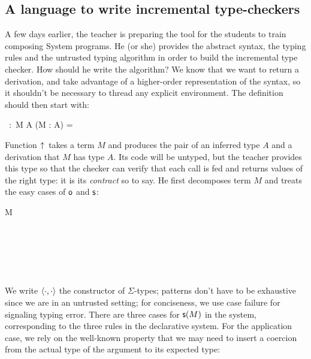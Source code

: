 \documentclass[9pt]{sigplanconf}
\begin{document}
\subsection{A language to write incremental type-checkers}

A few days earlier, the teacher is preparing the tool for the students
to train composing System  programs. He (or she)
provides the abstract syntax, the typing rules and the untrusted
typing algorithm in order to build the incremental type checker. How
should he write the algorithm? We know that we want to return a
derivation, and take advantage of a higher-order representation of the
syntax, so it shouldn't be necessary to thread any explicit
environment. The definition should then start with:

\begin{mathleft}
  \finfer{}\ :\ \prd M {} \sig A {} (\vdash M : A) =
\end{mathleft}

\noindent
Function $\uparrow\!{}$ takes a term $M$ and produces the pair of an
inferred type $A$ and a derivation that $M$ has type $A$. Its code
will be untyped, but the teacher provides this type so that the
checker can verify that each call is fed and returns values of the
right type: it is its \emph{contract} so to say. He first decomposes
term $M$ and treats the easy cases of $\text{\textsf{o}}$ and $\text{\textsf{s}}$:

\begin{mathleft}
  \lamd M  \\
  \quad\caseb{\z}  \\
  \quad{}
   \\
  \quad\quad{}
   \\
  \quad\quad{}
   \\
  \quad\quad{}
   \\
\end{mathleft}

\noindent
We write $\langle{\cdot}, {\cdot}\rangle$ the constructor of $\Sigma$-types;
patterns don't have to be exhaustive since we are in an untrusted
setting; for conciseness, we use case failure for signaling typing
error. There are three cases for $\text{\textsf{s}} ({M})$ in the system, corresponding
to the three rules in the declarative system. For the application
case, we rely on the well-known property that we may need to insert a
coercion from the actual type of the argument to its expected type:
\end{document}
